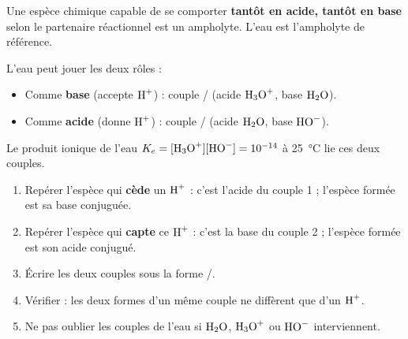 \documentclass[11pt]{article}
\newcommand{\cle}[1]{{\popxbold\color{popdark}#1}}
\begin{document}
\begin{definition}[Ampholyte]
Une espèce chimique capable de se comporter \textbf{tantôt en acide, tantôt en base} selon le partenaire réactionnel est un \cle{ampholyte}. L'eau est l'ampholyte de référence.
\end{definition}

\begin{propriete}
L'eau peut jouer les deux rôles :
\begin{itemize}
\item Comme \textbf{base} (accepte $\ce{H+}$) : couple / (acide $\ce{H3O+}$, base $\ce{H2O}$).
\item Comme \textbf{acide} (donne $\ce{H+}$) : couple / (acide $\ce{H2O}$, base $\ce{HO-}$).
\end{itemize}
Le produit ionique de l'eau $K_e = [\ce{H3O+}][\ce{HO-}] = 10^{-14}$ à \SI{25}{\celsius} lie ces deux couples.
\end{propriete}

\begin{methode}
\begin{enumerate}
\item Repérer l'espèce qui \textbf{cède} un $\ce{H+}$ : c'est l'acide du couple 1 ; l'espèce formée est sa base conjuguée.
\item Repérer l'espèce qui \textbf{capte} ce $\ce{H+}$ : c'est la base du couple 2 ; l'espèce formée est son acide conjugué.
\item Écrire les deux couples sous la forme /.
\item Vérifier : les deux formes d'un même couple ne diffèrent que d'un $\ce{H+}$.
\item Ne pas oublier les couples de l'eau si $\ce{H2O}$, $\ce{H3O+}$ ou $\ce{HO-}$ interviennent.
\end{enumerate}
\end{methode}
\end{document}
